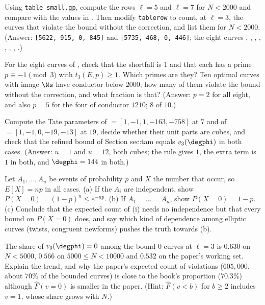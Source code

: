 \begin{sloppypar}
\begin{exercise}\label{exer:computation:tablerow}
Using \texttt{table\_small.gp}, compute the rows $\ell=5$ and $\ell=7$ for $N<2000$ and compare with the values in . Then modify
\texttt{tablerow} to count, at $\ell=3$, the curves that violate the bound without the correction, and list them for $N<2000$. (Answer: \texttt{[5622, 915,
0, 845]} and \texttt{[5735, 468, 0, 446]}; the eight curves , , , , , , ,
.)
\end{exercise}

\begin{exercise}\label{exer:computation:ns-check}
For the eight curves of , check that the shortfall is $1$ and that each has a prime $p\equiv-1\pmod3$ with $t_3(E,p)\ge1$. Which
primes are they? Ten optimal curves with image $\Ns$ have conductor below $2000$; how many of them violate the bound without the correction, and what
fraction is that? (Answer: $p=2$ for all eight, and also $p=5$ for the four of conductor $1210$; $8$ of $10$.)
\end{exercise}

\begin{exercise}\label{exer:computation:tate}
Compute the Tate parameters of  $=[1,-1,1,-163,-758]$ at $7$ and of  $=[1,-1,0,-19,-13]$ at $19$, decide whether their unit parts are
cubes, and check that the refined bound of Section sec:tam equals $v_3(\degphi)$ in both cases. (Answer: $\bar u=1$ and $\bar u=12$, both cubes; the
rule gives $1$, the extra term is $1$ in both, and $\degphi=144$ in both.)
\end{exercise}

\begin{exercise}[dependence]\label{exer:computation:dependence}
Let $A_1,\dots,A_n$ be events of probability $p$ and $X$ the number that occur, so $E[X]=np$ in all cases. (a) If the $A_i$ are independent, show
$P(X=0)=(1-p)^n\le e^{-np}$. (b) If $A_1=\dots=A_n$, show $P(X=0)=1-p$. (c) Conclude that the expected count of (i) needs
no independence but that every bound on $P(X=0)$ does, and say which kind of dependence among elliptic curves (twists, congruent newforms) pushes the
truth towards (b).
\end{exercise}

\begin{exercise}\label{exer:computation:f0}
The share of $v_3(\degphi)=0$ among the bound-$0$ curves at $\ell=3$ is $0.630$ on $N<5000$, $0.566$ on $5000\le N<10000$ and $0.532$ on the paper's working
set. Explain the trend, and why the paper's expected count of violations ($605{,}000$, about $70\%$ of the bounded curves) is close to the book's
proportion ($70.3\%$) although $\hat F(v=0)$ is smaller in the paper.
(Hint: $\hat F(v<b)$ for $b\ge2$ includes $v=1$, whose share grows with $N$.)
\end{exercise}


\end{sloppypar}
